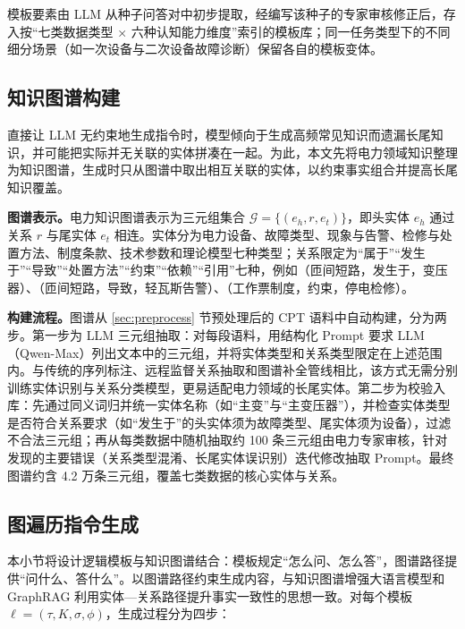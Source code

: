 \documentclass[fontset=fandol,type=master,campus=shenzhen,etitleauto=true]{hithesisbook}
\begin{document}
模板要素由 LLM 从种子问答对中初步提取，经编写该种子的专家审核修正后，存入按“七类数据类型 × 六种认知能力维度”索引的模板库；同一任务类型下的不同细分场景（如一次设备与二次设备故障诊断）保留各自的模板变体。

\subsection{知识图谱构建}\label{ux9762ux5411ux4e03ux7c7bux6570ux636eux7684ux7535ux529bux77e5ux8bc6ux56feux8c31ux6784ux5efa}

直接让 LLM 无约束地生成指令时，模型倾向于生成高频常见知识而遗漏长尾知识，并可能把实际并无关联的实体拼凑在一起。为此，本文先将电力领域知识整理为知识图谱，生成时只从图谱中取出相互关联的实体，以约束事实组合并提高长尾知识覆盖。

\textbf{图谱表示。}电力知识图谱表示为三元组集合 $\mathcal{G} = \{(e_h, r, e_t)\}$，即头实体 $e_h$ 通过关系 $r$ 与尾实体 $e_t$ 相连。实体分为电力设备、故障类型、现象与告警、检修与处置方法、制度条款、技术参数和理论模型七种类型；关系限定为“属于”“发生于”“导致”“处置方法”“约束”“依赖”“引用”七种，例如（匝间短路，发生于，变压器）、（匝间短路，导致，轻瓦斯告警）、（工作票制度，约束，停电检修）。

\textbf{构建流程。}图谱从 \ref{sec:preprocess} 节预处理后的 CPT 语料中自动构建，分为两步。第一步为 LLM 三元组抽取：对每段语料，用结构化 Prompt 要求 LLM（Qwen-Max）列出文本中的三元组，并将实体类型和关系类型限定在上述范围内。与传统的序列标注、远程监督关系抽取和图谱补全管线\cite{ref70,ref71,ref72,ref73,ref74}相比，该方式无需分别训练实体识别与关系分类模型，更易适配电力领域的长尾实体。第二步为校验入库：先通过同义词归并统一实体名称（如“主变”与“主变压器”），并检查实体类型是否符合关系要求（如“发生于”的头实体须为故障类型、尾实体须为设备），过滤不合法三元组；再从每类数据中随机抽取约 100 条三元组由电力专家审核，针对发现的主要错误（关系类型混淆、长尾实体误识别）迭代修改抽取 Prompt。最终图谱约含 4.2 万条三元组，覆盖七类数据的核心实体与关系。

\subsection{图遍历指令生成}\label{ux903bux8f91ux6a21ux677fux9a71ux52a8ux7684ux56feux904dux5386ux751fux6210}

本小节将设计逻辑模板与知识图谱结合：模板规定“怎么问、怎么答”，图谱路径提供“问什么、答什么”。以图谱路径约束生成内容，与知识图谱增强大语言模型和 GraphRAG 利用实体—关系路径提升事实一致性的思想一致\cite{ref15,ref16}。对每个模板 $\ell = (\tau, K, \sigma, \phi)$，生成过程分为四步：
\end{document}
